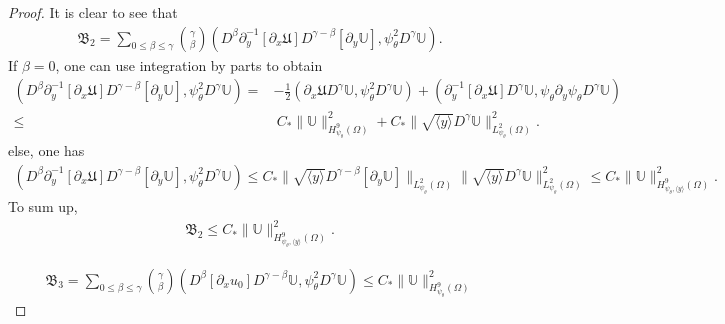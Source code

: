 \documentclass{amsart}
\numberwithin{equation}{section}
\newcommand\y{{{\langle y \rangle}}}
\begin{document}
\begin{proof}
It is clear to see that
\begin{align*}
\mathfrak{B}_{2}
=\sum_{0\leq\beta\leq\gamma}\binom{\gamma}{\beta}(D^{\beta}\partial_{y}^{-1}[\partial_{x}\mathfrak{U}]D^{\gamma-\beta}[\partial_{y}\mathbb{U}],\psi_{\theta}^{2}D^{\gamma}\mathbb{U}).
\end{align*}
If $\beta=0$, one can use integration by parts to obtain
\begin{align*}
(D^{\beta}\partial_{y}^{-1}[\partial_{x}\mathfrak{U}]D^{\gamma-\beta}[\partial_{y}\mathbb{U}],\psi_{\theta}^{2}D^{\gamma}\mathbb{U})
=&-\frac{1}{2}(\partial_{x}\mathfrak{U}D^{\gamma}\mathbb{U},\psi_{\theta}^{2}D^{\gamma}\mathbb{U})
 +(\partial_{y}^{-1}[\partial_{x}\mathfrak{U}]D^{\gamma}\mathbb{U},\psi_{\theta}\partial_{y}\psi_{\theta}D^{\gamma}\mathbb{U})\\
\leq&~C_{*}\|\mathbb{U}\|_{H_{\psi_{\theta}}^{9}(\Omega)}^{2}
     +C_{*}\|\sqrt{\y}D^{\gamma}\mathbb{U}\|_{L_{\psi_{\theta}}^{2}(\Omega)}^{2}.
\end{align*}
else, one has
\begin{align*}
(D^{\beta}\partial_{y}^{-1}[\partial_{x}\mathfrak{U}]D^{\gamma-\beta}[\partial_{y}\mathbb{U}],\psi_{\theta}^{2}D^{\gamma}\mathbb{U})
\leq C_{*}\|\sqrt{\y}D^{\gamma-\beta}[\partial_{y}\mathbb{U}]\|_{L_{\psi_{\theta}}^{2}(\Omega)}
          \|\sqrt{\y}D^{\gamma}\mathbb{U}\|_{L_{\psi_{\theta}}^{2}(\Omega)}^{2}
\leq C_{*}\|\mathbb{U}\|_{H_{\psi_{\theta},\y}^{9}(\Omega)}^{2}.
\end{align*}
To sum up,
\begin{align*}
\mathfrak{B}_{2}
\leq C_{*}\|\mathbb{U}\|_{H_{\psi_{\theta},\y}^{9}(\Omega)}^{2}.
\end{align*}

\begin{align*}
\mathfrak{B}_{3}
=\sum_{0\leq\beta\leq\gamma}\binom{\gamma}{\beta}(D^{\beta}[\partial_{x}u_{0}]D^{\gamma-\beta}\mathbb{U},\psi_{\theta}^{2}D^{\gamma}\mathbb{U})
\leq C_{*}\|\mathbb{U}\|_{H_{\psi_{\theta}}^{9}(\Omega)}^{2}
\end{align*}


\end{proof}
\end{document}
